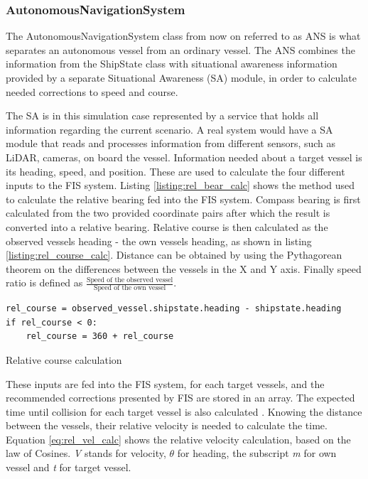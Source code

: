 \subsubsection{AutonomousNavigationSystem}
\label{sec:ANS}
The AutonomousNavigationSystem class from now on referred to as ANS is what separates an autonomous vessel from an ordinary vessel. The ANS combines the information from the ShipState class with situational awareness information provided by a separate Situational Awareness (SA) module, in order to calculate needed corrections to speed and course.

The SA is in this simulation case represented by a service that holds all information regarding the current scenario. A real system would have a SA module that reads and processes information from different sensors, such as LiDAR, cameras, on board the vessel. Information needed about a target vessel is its heading, speed, and position. These are used to calculate the four different inputs to the FIS system. Listing \ref{listing:rel_bear_calc} shows the method used to calculate the relative bearing fed into the FIS system. Compass bearing is first calculated from the two provided coordinate pairs after which the result is converted into a relative bearing. Relative course is then calculated as the observed vessels heading - the own vessels heading, as shown in listing \ref{listing:rel_course_calc}. Distance can be obtained by using the Pythagorean theorem on the differences between the vessels in the X and Y axis. Finally speed ratio is defined as $\frac{\text{Speed of the observed vessel}}{\text{Speed of the own vessel}}$.
\begin{listing}

    \begin{verbatim}
rel_course = observed_vessel.shipstate.heading - shipstate.heading
if rel_course < 0:
    rel_course = 360 + rel_course
    \end{verbatim}
    \caption{Relative course calculation}
    \label{listing:rel_course_calc}
\end{listing}

These inputs are fed into the FIS system, for each target vessels, and the recommended corrections presented by FIS are stored in an array. The expected time until collision for each target vessel is also calculated . Knowing the distance between the vessels, their relative velocity is needed to calculate the time. Equation \ref{eq:rel_vel_calc} shows the relative velocity calculation, based on the law of Cosines. \textit{V} stands for velocity, $\theta$ for heading, the subscript \textit{m} for own vessel and \textit{t} for target vessel.

